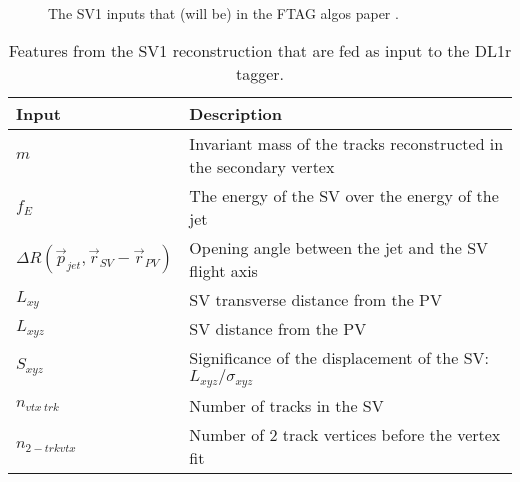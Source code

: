  \begin{figure}[htbp]
        \centering
                  \\ 
        \caption{The SV1 inputs that (will be) in the FTAG algos paper \cite{ANA-FTAG-2019-07}.}
        \label{fig:sv1 inputs}
\end{figure}


\begin{table}[h!]
  \centering
    \begin{tabular}{p{4cm} | p{10cm}  }  
      \textbf{Input} & \textbf{Description}  \\
      \hline
      \hline
  	 $m$ & Invariant mass of the tracks reconstructed in the secondary vertex \\
	 $f_E$ &The energy of the SV over the energy of the jet \\
	 $\Delta R(\vec{p}_{jet},\vec{r}_{SV} - \vec{r}_{PV})$ & Opening angle between the jet and the SV flight axis \\
	 $L_{xy}$ & SV transverse distance from the PV \\
	 $L_{xyz}$ & SV distance from the PV \\
 	 $S_{xyz}$ & Significance of the displacement of the SV: $L_{xyz} / \sigma_{xyz}$ \\
	$n_{vtx \ trk}$ & Number of tracks in the SV \\
	$n_{2-trk vtx}$ & Number of 2 track vertices before the vertex fit \\
    \end{tabular}
    \caption{Features from the SV1 reconstruction that are fed as input to the DL1r tagger.}
    \label{tab:sv1-inputs}
\end{table}

